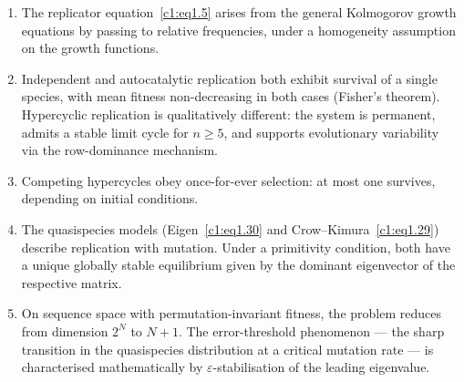 \documentclass[12pt]{report}
\theoremstyle{definition}
\theoremstyle{remark}
\begin{document}
\begin{enumerate}
	\item The replicator equation~\eqref{c1:eq1.5} arises from the general
	Kolmogorov growth equations by passing to relative frequencies,
	under a homogeneity assumption on the growth functions.
	
	\item Independent and autocatalytic replication both exhibit
	survival of a single species, with mean fitness non-decreasing in
	both cases (Fisher's theorem). Hypercyclic replication is qualitatively
	different: the system is permanent, admits a stable limit cycle for
	$n\geqslant 5$, and supports evolutionary variability via the
	row-dominance mechanism.
	
	\item Competing hypercycles obey once-for-ever selection: at most one
	survives, depending on initial conditions.
	
	\item The quasispecies models (Eigen~\eqref{c1:eq1.30} and
	Crow--Kimura~\eqref{c1:eq1.29}) describe replication with mutation.
	Under a primitivity condition, both have a unique globally stable
	equilibrium given by the dominant eigenvector of the respective
	matrix.
	
	\item On sequence space with permutation-invariant fitness, the
	problem reduces from dimension $2^N$ to $N+1$. The
	error-threshold phenomenon — the sharp transition in the quasispecies
	distribution at a critical mutation rate — is characterised
	mathematically by $\varepsilon$-stabilisation of the leading
	eigenvalue.
\end{enumerate}
\end{document}
